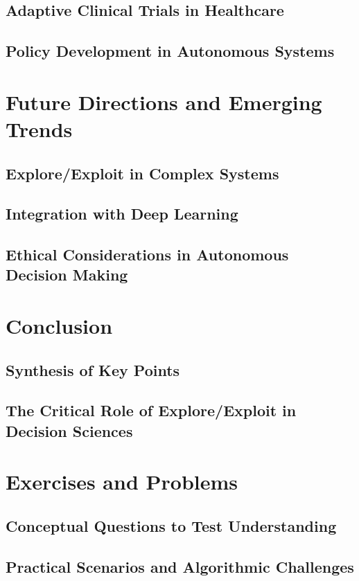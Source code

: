 \documentclass[12pt]{book} %
\begin{document}
\subsection{Adaptive Clinical Trials in Healthcare}
\subsection{Policy Development in Autonomous Systems}

\section{Future Directions and Emerging Trends}
\subsection{Explore/Exploit in Complex Systems}
\subsection{Integration with Deep Learning}
\subsection{Ethical Considerations in Autonomous Decision Making}

\section{Conclusion}
\subsection{Synthesis of Key Points}
\subsection{The Critical Role of Explore/Exploit in Decision Sciences}

\section{Exercises and Problems}
\subsection{Conceptual Questions to Test Understanding}
\subsection{Practical Scenarios and Algorithmic Challenges}
\end{document}
